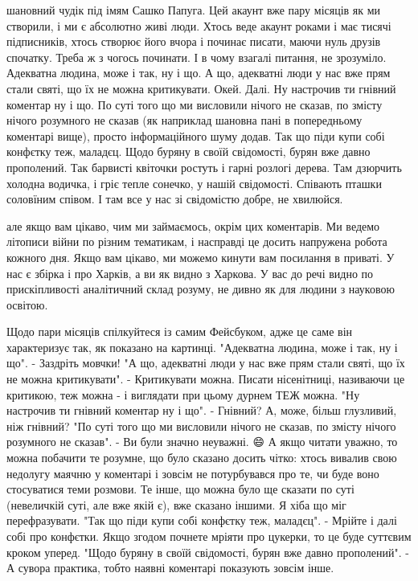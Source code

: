 шановний чудік під імям Сашко Папуга. Цей акаунт вже пару місяців як ми
створили, і ми є абсолютно живі люди. Хтось веде акаунт роками і має тисячі
підписників, хтось створює його вчора і починає писати, маючи нуль друзів
спочатку. Треба ж з чогось починати. І в чому взагалі питання, не зрозуміло.
Адекватна людина, може і так, ну і що. А що, адекватні люди у нас вже прям
стали святі, що їх не можна критикувати. Окей. Далі. Ну настрочив ти гнівний
коментар ну і що. По суті того що ми висловили нічого не сказав, по змісту
нічого розумного не сказав (як наприклад шановна пані в попередньому коментарі
вище), просто інформаційного шуму додав. Так що піди купи собі конфєтку теж,
маладєц. Щодо буряну в своїй свідомості, бурян вже давно прополений. Так
барвисті квіточки ростуть і гарні розлогі дерева. Там дзюрчить холодна водичка,
і гріє тепле сонечко, у нашій свідомості. Співають пташки соловїним співом. І
там все у нас зі свідомістю добре, не хвилюйся.

але якщо вам цікаво, чим ми займаємось, окрім цих коментарів. Ми ведемо
літописи війни по різним тематикам, і насправді це досить напружена робота
кожного дня. Якщо вам цікаво, ми можемо кинути вам посилання в приваті. У нас є
збірка і про Харків, а ви як видно з Харкова. У вас до речі видно по
прискіпливості аналітичний склад розуму, не дивно як для людини з науковою
освітою.

Щодо пари місяців спілкуйтеся із самим Фейсбуком, адже це саме він характеризує
так, як показано на картинці.  "Адекватна людина, може і так, ну і що". -
Заздріть мовчки!  "А що, адекватні люди у нас вже прям стали святі, що їх не
можна критикувати". - Критикувати можна. Писати нісенітниці, називаючи це
критикою, теж можна - і виглядати при цьому дурнем ТЕЖ можна.  "Ну настрочив ти
гнівний коментар ну і що". - Гнівний? А, може, більш глузливий, ніж гнівний?
"По суті того що ми висловили нічого не сказав, по змісту нічого розумного не
сказав". - Ви були значно неуважні. 😄 А якщо читати уважно, то можна побачити
те розумне, що було сказано досить чітко: хтось вивалив свою недолугу маячню у
коментарі і зовсім не потурбувався про те, чи буде воно стосуватися теми
розмови. Те інше, що можна було ще сказати по суті (невеличкій суті, але вже
якій є), вже сказано іншими. Я хіба що міг перефразувати.  "Так що піди купи
собі конфєтку теж, маладєц". - Мрійте і далі собі про конфєтки. Якщо згодом
почнете мріяти про цукерки, то це буде суттєвим кроком уперед.  "Щодо буряну в
своїй свідомості, бурян вже давно прополений". - А сувора практика, тобто
наявні коментарі показують зовсім інше.
